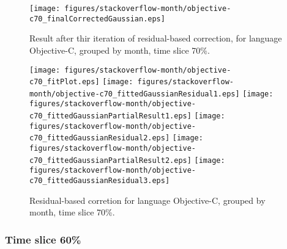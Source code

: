 \begin{figure}[]
\centering
{\texttt{[image: figures/stackoverflow-month/objective-c70\_finalCorrectedGaussian.eps]}}
\caption{Result after thir iteration of residual-based correction, for language Objective-C, grouped by month, time slice 70\%.}
\end{figure}


\begin{figure}[hb]
\centering
{}
{\texttt{[image: figures/stackoverflow-month/objective-c70\_fitPlot.eps]}}
{\texttt{[image: figures/stackoverflow-month/objective-c70\_fittedGaussianResidual1.eps]}}
{\texttt{[image: figures/stackoverflow-month/objective-c70\_fittedGaussianPartialResult1.eps]}}
{\texttt{[image: figures/stackoverflow-month/objective-c70\_fittedGaussianResidual2.eps]}}
{\texttt{[image: figures/stackoverflow-month/objective-c70\_fittedGaussianPartialResult2.eps]}}
{\texttt{[image: figures/stackoverflow-month/objective-c70\_fittedGaussianResidual3.eps]}}
\caption{Residual-based corretion for language Objective-C, grouped by month, time slice 70\%.}
\end{figure}


\clearpage 
\newpage 


\FloatBarrier

\subsubsection{Time slice 60\%}

